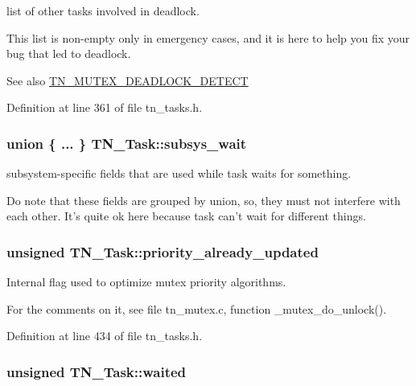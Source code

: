list of other tasks involved in deadlock. 

This list is non-\/empty only in emergency cases, and it is here to help you fix your bug that led to deadlock.

\begin{DoxySeeAlso}{See also}
{\ttfamily \hyperlink{tn__cfg__default_8h_a6ed3ec7b0d4338e7f60dde86b7ea5fa4}{T\+N\+\_\+\+M\+U\+T\+E\+X\+\_\+\+D\+E\+A\+D\+L\+O\+C\+K\+\_\+\+D\+E\+T\+E\+C\+T}} 
\end{DoxySeeAlso}


Definition at line 361 of file tn\+\_\+tasks.\+h.

\hypertarget{structTN__Task_ae6f4bd3d67e5499ef2c5fb7c72ec6276}{
\subsubsection[{subsys\+\_\+wait}]{\setlength{\rightskip}{0pt plus 5cm}union \{ ... \}   T\+N\+\_\+\+Task\+::subsys\+\_\+wait}}\label{structTN__Task_ae6f4bd3d67e5499ef2c5fb7c72ec6276}


subsystem-\/specific fields that are used while task waits for something. 

Do note that these fields are grouped by union, so, they must not interfere with each other. It's quite ok here because task can't wait for different things. \hypertarget{structTN__Task_abb4d22974c7317dd610f646b9048656d}{
\subsubsection[{priority\+\_\+already\+\_\+updated}]{\setlength{\rightskip}{0pt plus 5cm}unsigned T\+N\+\_\+\+Task\+::priority\+\_\+already\+\_\+updated}}\label{structTN__Task_abb4d22974c7317dd610f646b9048656d}


Internal flag used to optimize mutex priority algorithms. 

For the comments on it, see file tn\+\_\+mutex.\+c, function {\ttfamily \+\_\+mutex\+\_\+do\+\_\+unlock()}. 

Definition at line 434 of file tn\+\_\+tasks.\+h.

\hypertarget{structTN__Task_a47c3a0a27be1ee526a1599a2ca8bb269}{
\subsubsection[{waited}]{\setlength{\rightskip}{0pt plus 5cm}unsigned T\+N\+\_\+\+Task\+::waited}}\label{structTN__Task_a47c3a0a27be1ee526a1599a2ca8bb269}


